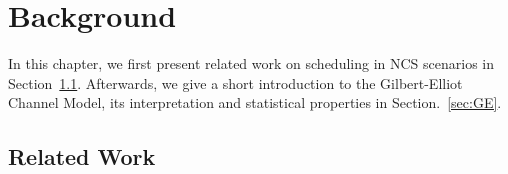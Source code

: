 \chapter{Background}


In this chapter, we first present related work on scheduling in NCS scenarios in
Section~\ref{sec:survey}. Afterwards, we give a short introduction to the
Gilbert-Elliot Channel Model, its interpretation and statistical properties in
Section.~\ref{sec:GE}. 

\section{Related Work} \label{sec:survey}

